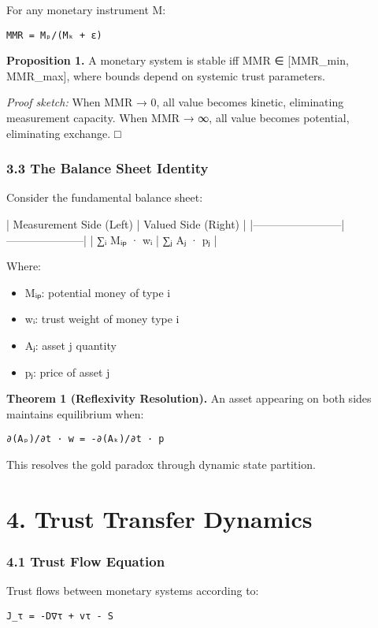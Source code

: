 \documentclass[11pt,oneside]{book}
\begin{document}
For any monetary instrument M:

\begin{verbatim}
MMR = Mₚ/(Mₖ + ε)
\end{verbatim}

\textbf{Proposition 1.} A monetary system is stable iff MMR ∈ [MMR_min, MMR_max], where bounds depend on systemic trust parameters.

\textit{Proof sketch:} When MMR → 0, all value becomes kinetic, eliminating measurement capacity. When MMR → ∞, all value becomes potential, eliminating exchange. □

\subsubsection{3.3 The Balance Sheet Identity}

Consider the fundamental balance sheet:

| Measurement Side (Left) | Valued Side (Right) |
|------------------------|---------------------|
| ∑ᵢ Mᵢₚ · wᵢ | ∑ⱼ Aⱼ · pⱼ |

Where:
\begin{itemize}
\item Mᵢₚ: potential money of type i
\item wᵢ: trust weight of money type i
\item Aⱼ: asset j quantity
\item pⱼ: price of asset j
\end{itemize}

\textbf{Theorem 1 (Reflexivity Resolution).} An asset appearing on both sides maintains equilibrium when:

\begin{verbatim}
∂(Aₚ)/∂t · w = -∂(Aₖ)/∂t · p
\end{verbatim}

This resolves the gold paradox through dynamic state partition.

\section{4. Trust Transfer Dynamics}

\subsubsection{4.1 Trust Flow Equation}

Trust flows between monetary systems according to:

\begin{verbatim}
J_τ = -D∇τ + vτ - S
\end{verbatim}
\end{document}
